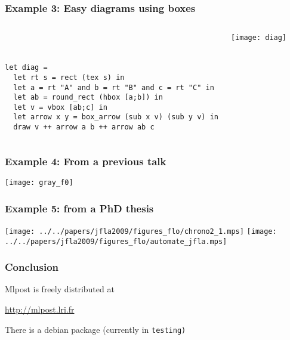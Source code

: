 \documentclass[nodefaultblocks]{beamer}
\begin{document}
\begin{frame}[fragile]
\frametitle{Example 3: Easy diagrams using boxes}
\begin{columns}
\small
\begin{verbatim}



let diag =
  let rt s = rect (tex s) in
  let a = rt "A" and b = rt "B" and c = rt "C" in
  let ab = round_rect (hbox [a;b]) in
  let v = vbox [ab;c] in
  let arrow x y = box_arrow (sub x v) (sub y v) in
  draw v ++ arrow a b ++ arrow ab c 
\end{verbatim}
\texttt{[image: diag]}
\end{columns}

\end{frame}
\begin{frame}
\frametitle{Example 4: From a previous talk}

\begin{center}
\texttt{[image: gray\_f0]}
\end{center}
\end{frame}

\begin{frame}
  \frametitle{Example 5: from a PhD thesis}
  \texttt{[image: ../../papers/jfla2009/figures\_flo/chrono2\_1.mps]}
  \texttt{[image: ../../papers/jfla2009/figures\_flo/automate\_jfla.mps]}
\end{frame}


\begin{frame}\frametitle{Conclusion}

Mlpost is freely distributed at

\begin{center}
  \url{http://mlpost.lri.fr}
\end{center}

There is a debian package (currently in \tt{testing})

\end{frame}
\end{document}
